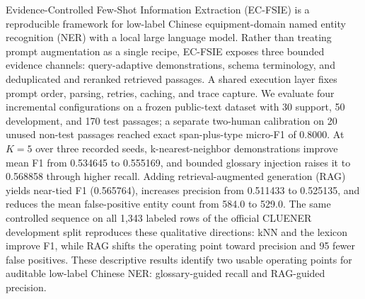 Evidence-Controlled Few-Shot Information Extraction (EC-FSIE) is a
reproducible framework for low-label Chinese equipment-domain named entity
recognition (NER) with a local large language model. Rather than treating
prompt augmentation as a single recipe, EC-FSIE exposes three bounded evidence
channels: query-adaptive demonstrations, schema terminology, and deduplicated
and reranked retrieved passages. A shared execution layer fixes prompt order,
parsing, retries, caching, and trace capture. We evaluate four incremental
configurations on a frozen public-text dataset with 30 support, 50 development,
and 170 test passages; a separate two-human calibration on 20 unused non-test
passages reached exact span-plus-type micro-F1 of 0.8000. At $K=5$ over three
recorded seeds, k-nearest-neighbor demonstrations improve mean F1 from 0.534645
to 0.555169, and bounded glossary injection raises it to 0.568858 through
higher recall. Adding retrieval-augmented generation (RAG) yields near-tied F1
(0.565764), increases precision from 0.511433 to 0.525135, and reduces the mean
false-positive entity count from 584.0 to 529.0. The same controlled sequence
on all 1,343 labeled rows of the official CLUENER development split reproduces
these qualitative directions: kNN and the lexicon improve F1, while RAG shifts
the operating point toward precision and 95 fewer false positives. These
descriptive results identify two usable operating points for auditable
low-label Chinese NER: glossary-guided recall and RAG-guided precision.
